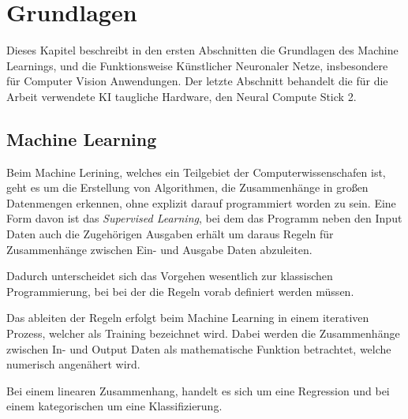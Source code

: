 \chapter{Grundlagen}\label{kap:grundlagen}


Dieses Kapitel beschreibt in den ersten Abschnitten die Grundlagen 
des Machine Learnings, und die Funktionsweise Künstlicher Neuronaler Netze,
insbesondere für Computer Vision Anwendungen.
Der letzte Abschnitt behandelt die für die Arbeit verwendete KI taugliche 
Hardware, den Neural Compute Stick 2.




\section{Machine Learning}\label{sec:ml}

Beim Machine Lerining, welches ein Teilgebiet der Computerwissenschafen
ist, geht es um die Erstellung von Algorithmen, die Zusammenhänge in großen
Datenmengen erkennen, ohne explizit darauf programmiert worden zu sein.
Eine Form davon ist das \textit{Supervised Learning}, bei dem das Programm 
neben den Input Daten auch die Zugehörigen Ausgaben erhält um daraus 
Regeln für Zusammenhänge zwischen Ein- und Ausgabe Daten abzuleiten.

Dadurch unterscheidet sich das Vorgehen wesentlich zur klassischen Programmierung,
bei bei der die Regeln vorab definiert werden müssen.


\vspace{0.5cm}
\begin{figure}[htb]
    \centering
    \def\svgwidth{0.8\columnwidth}
    \footnotesize
    
\end{figure}
\vspace{0.5cm}



Das ableiten der Regeln erfolgt beim Machine Learning in einem 
iterativen Prozess, welcher als Training bezeichnet wird.
Dabei werden die Zusammenhänge zwischen In- und Output Daten 
als mathematische Funktion betrachtet, welche numerisch 
angenähert wird.

Bei einem linearen Zusammenhang, handelt es sich
um eine Regression und bei einem kategorischen um 
eine Klassifizierung.

